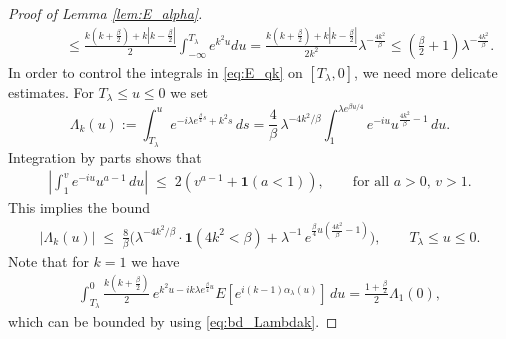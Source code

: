 \documentclass[12pt]{article}
\theoremstyle{definition} %
\theoremstyle{remark} %
\newcommand{\ind}{\mathbf 1}
\begin{document}
\begin{proof}[Proof of Lemma \ref{lem:E_alpha}]
\begin{align}
&\qquad \le \frac{k(k+\tfrac{\beta}{2})+k|k-\tfrac{\beta}{2}|}{2}\int_{-\infty}^{T_\lambda} e^{k^2 u} du=\frac{k(k+\tfrac{\beta}{2})+k|k-\tfrac{\beta}{2}|}{2k^2} \lambda^{-\frac{4k^2}{\beta}}\le (\tfrac{\beta}{2}+1) \lambda^{-\frac{4k^2}{\beta}}.\label{eq:term_97}
\end{align}
In order to control the integrals in \eqref{eq:E_qk} on  $[T_\lambda,0]$, we need more delicate estimates. 
For $T_\lambda\le u\le 0$ we set
\[
    \Lambda_k(u)
    := \int_{T_\lambda}^u e^{-i \lambda e^{\frac{\beta}{4}s}+ k^2 s}\, ds
    = \frac{4}{\beta}\, \lambda^{-4k^2/\beta}
        \int_1^{\lambda e^{\beta u/4}} e^{-i u} u^{\frac{4k^2}{\beta}-1}\, du.
\]
Integration by parts shows that  
\begin{align}\label{eq:llasym_ibp}
          \left|\int_1^v e^{-i u} u^{a-1}\,du\right|
    \;\leq\; 2 (v^{a-1}+\ind(a<1)), \qquad \text{for all $a>0$, $v>1$.}
\end{align}
This implies the bound
\begin{align}\label{eq:bd_Lambdak}
    |\Lambda_k(u)|
    \;\leq\; \frac{8}{\beta}\Big(\lambda^{-4k^2/\beta}\cdot \ind(4k^2<\beta)
    + \lambda^{-1}\, e^{\frac{\beta}{4}u(\frac{4k^2}{\beta}-1)}\Big), \qquad T_\lambda\le u\le 0.
\end{align}
Note that for $k=1$ we have
\begin{align}\label{eq:Lambda1_99}
\int_{T_\lambda}^0  \frac{k(k+\frac{\beta}{2})}{2}\, e^{k^2 u - i k \lambda e^{\frac{\beta}{4}u}} E[e^{i (k-1)\alpha_\lambda(u)}]\, du=\tfrac{1+\frac{\beta}{2}}{2} \Lambda_1(0), 
\end{align}
which can be bounded by using \eqref{eq:bd_Lambdak}.


\end{proof}
\end{document}
